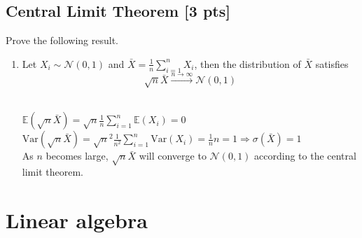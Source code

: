 \documentclass[a4paper]{article}
\theoremstyle{definition}
\newcommand{\Var}{\mathrm{Var}}
\newenvironment{soln}{
	\leavevmode\color{blue}\ignorespaces
}{}
\begin{document}
	\subsection{Central Limit Theorem [3 pts]}
	Prove the following result.
	\begin{enumerate}
		\item Let $X_i\sim\mathcal{N}(0, 1)$ and $\bar{X} = \frac{1}{n}\sum_{i=1}^n X_i$, then the distribution of $\bar{X}$ satisfies 
		$$\sqrt{n}\bar{X}\overset{n\rightarrow\infty}{\longrightarrow}\mathcal{N}(0, 1)$$
		
		\begin{soln}\\
		$\mathbb{E}(\sqrt{n}\bar{X}) = \sqrt{n} \frac{1}{n}\sum_{i=1}^n \mathbb{E}(X_i) = 0$\\ 
		$\Var(\sqrt{n}\bar{X}) = \sqrt{n}^2 \frac{1}{n^2}\sum_{i=1}^n \Var(X_i) = \frac{1}{n} n = 1 \Rightarrow \sigma(\bar{X}) = 1$\\
		As $n$ becomes large, $\sqrt{n}\bar{X}$ will converge to $\mathcal{N}(0, 1)$ according to the central limit theorem.
		\end{soln}
		
	\end{enumerate}
	
	
	
	\section{Linear algebra}
	
	
\end{document}
